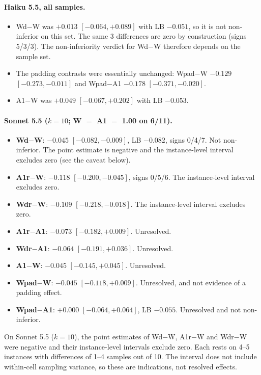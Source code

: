 \documentclass[10pt]{article}
\begin{document}
\paragraph{Haiku 5.5, all samples.}
\begin{itemize}
\item Wd$-$W was $+0.013$ $[-0.064, +0.089]$ with LB $-0.051$, so it is not non-inferior on this set. The same 3 differences are zero by construction (signs 5/3/3). The non-inferiority verdict for Wd$-$W therefore depends on the sample set.
\item The padding contrasts were essentially unchanged: Wpad$-$W $-0.129$ $[-0.273, -0.011]$ and Wpad$-$A1 $-0.178$ $[-0.371, -0.020]$.
\item A1$-$W was $+0.049$ $[-0.067, +0.202]$ with LB $-0.053$.
\end{itemize}

\paragraph{Sonnet 5.5 ($k=10$; W $=$ A1 $=$ 1.00 on 6/11).}
\begin{itemize}
\item \textbf{Wd$-$W}: $-0.045$ $[-0.082, -0.009]$, LB $-0.082$, signs 0/4/7. Not non-inferior. The point estimate is negative and the instance-level interval excludes zero (see the caveat below).
\item \textbf{A1r$-$W}: $-0.118$ $[-0.200, -0.045]$, signs 0/5/6. The instance-level interval excludes zero.
\item \textbf{Wdr$-$W}: $-0.109$ $[-0.218, -0.018]$. The instance-level interval excludes zero.
\item \textbf{A1r$-$A1}: $-0.073$ $[-0.182, +0.009]$. Unresolved.
\item \textbf{Wdr$-$A1}: $-0.064$ $[-0.191, +0.036]$. Unresolved.
\item \textbf{A1$-$W}: $-0.045$ $[-0.145, +0.045]$. Unresolved.
\item \textbf{Wpad$-$W}: $-0.045$ $[-0.118, +0.009]$. Unresolved, and not evidence of a padding effect.
\item \textbf{Wpad$-$A1}: $+0.000$ $[-0.064, +0.064]$, LB $-0.055$. Unresolved and not non-inferior.
\end{itemize}
On Sonnet 5.5 ($k=10$), the point estimates of Wd$-$W, A1r$-$W and Wdr$-$W were negative and their instance-level intervals exclude zero. Each rests on 4--5 instances with differences of 1--4 samples out of 10. The interval does not include within-cell sampling variance, so these are indications, not resolved effects.
\end{document}

